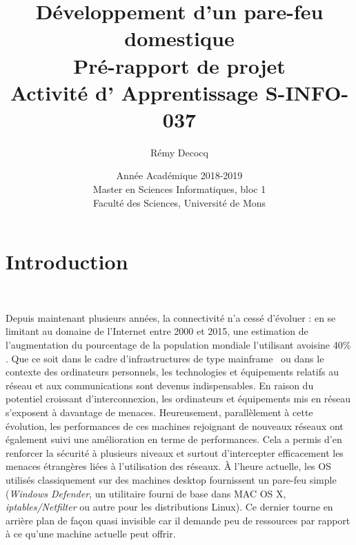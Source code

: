 \documentclass[]{article}
\begin{document}
\title{
\vspace{1.6cm}
{\Huge Développement d'un pare-feu domestique}\\
\vspace{0.5cm}
{\Huge Pré-rapport de projet}\\
\vspace{0.2cm}
{\large Activité d' Apprentissage \textsf{S-INFO-037}}\\
}



\author{
\vspace{0.9cm}
\huge{Rémy Decocq}
}

\date{
\vspace{8.5cm}
Année Académique 2018-2019\\
Master en Sciences Informatiques, bloc 1\\
Faculté des Sciences, Université de Mons}

\maketitle          

\thispagestyle{empty}   

\newpage

\tableofcontents
\newpage

\section*{Introduction}
~\\
\par Depuis maintenant plusieurs années, la connectivité n'a cessé d'évoluer : en se limitant au domaine de l'Internet entre 2000 et 2015, une estimation de l'augmentation du pourcentage de la population mondiale l'utilisant avoisine 40\%  \cite{IWS} \cite{Cable}. Que ce soit dans le cadre d'infrastructures de type \og mainframe \fg \ ou dans le contexte des ordinateurs personnels, les technologies et équipements relatifs au réseau et aux communications sont devenus indispensables. En raison du potentiel croissant d'interconnexion, les ordinateurs et équipements mis en réseau s'exposent à davantage de menaces. Heureusement, parallèlement à cette évolution, les performances de ces machines rejoignant de nouveaux réseaux ont également suivi une amélioration en terme de performances. Cela a permis d'en renforcer la sécurité à plusieurs niveaux et surtout d'intercepter efficacement les menaces étrangères liées à l'utilisation des réseaux. À l'heure actuelle, les OS utilisés classiquement sur des machines desktop fournissent un pare-feu simple (\textit{Windows Defender}, un utilitaire fourni de base dans MAC OS X, \textit{iptables/Netfilter} ou autre pour les distributions Linux). Ce dernier tourne en arrière plan de façon quasi invisible car il demande peu de ressources par rapport à ce qu'une machine actuelle peut offrir.\\
\end{document}

